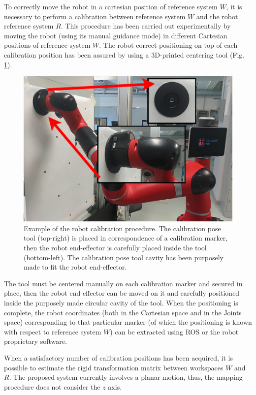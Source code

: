 \documentclass[a4paper, 10 pt, conference]{ieeeconf}      %
\begin{document}
To correctly move the robot in a cartesian position of reference system $W$, it is necessary to perform a calibration between reference system $W$ and the robot reference system $R$. This procedure has been carried out experimentally by moving the robot (using its manual guidance mode) in different Cartesian positions of reference system $W$. The robot correct positioning on top of each calibration position has been assured by using a 3D-printed centering tool (Fig. \ref{fig:robotcalib}). 
\begin{figure}[b]
	\centering
	\includegraphics[width=1\columnwidth]{figures/robotcalibration}
	\caption{Example of the robot calibration procedure. The calibration pose tool (top-right) is placed in correspondence of a calibration marker, then the robot end-effector is carefully placed inside the tool (bottom-left). The calibration pose tool cavity has been purposely made to fit the robot end-effector.}
	\label{fig:robotcalib}
\end{figure}

The tool must be centered manually on each calibration marker and secured in place, then the robot end effector can be moved on it and carefully positioned inside the purposely made circular cavity of the tool. When the positioning is complete, the robot coordinates (both in the Cartesian space and in the Joints space) corresponding to that particular marker (of which the positioning is known with respect to reference system $W$) can be extracted using ROS or the robot proprietary software. 

When a satisfactory number of calibration positions has been acquired, it is possible to estimate the rigid transformation matrix between workspaces $W$ and $R$. The proposed system currently involves a planar motion, thus, the mapping procedure does not consider the $z$ axis.
\end{document}
